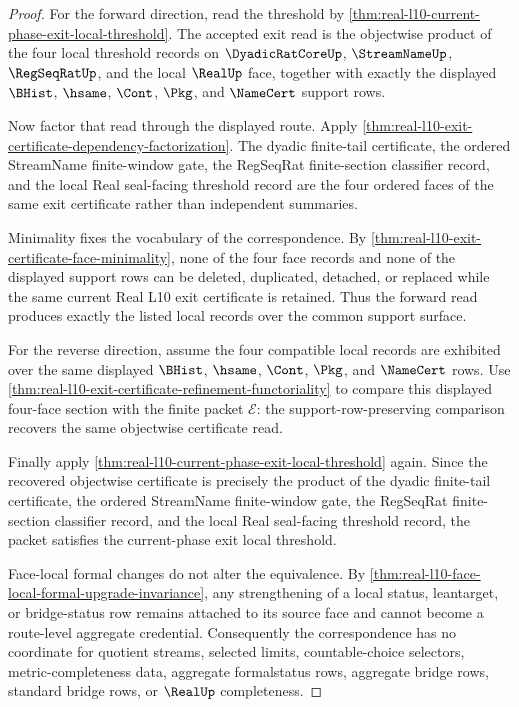 \begin{proof}
For the forward direction, read the threshold by \autoref{thm:real-l10-current-phase-exit-local-threshold}. The accepted exit read is the objectwise product of the four local threshold records on $\DyadicRatCoreUp$, $\StreamNameUp$, $\RegSeqRatUp$, and the local $\RealUp$ face, together with exactly the displayed $\BHist$, $\hsame$, $\Cont$, $\Pkg$, and $\NameCert$ support rows.

Now factor that read through the displayed route. Apply \autoref{thm:real-l10-exit-certificate-dependency-factorization}. The dyadic finite-tail certificate, the ordered StreamName finite-window gate, the RegSeqRat finite-section classifier record, and the local Real seal-facing threshold record are the four ordered faces of the same exit certificate rather than independent summaries.

Minimality fixes the vocabulary of the correspondence. By \autoref{thm:real-l10-exit-certificate-face-minimality}, none of the four face records and none of the displayed support rows can be deleted, duplicated, detached, or replaced while the same current Real L10 exit certificate is retained. Thus the forward read produces exactly the listed local records over the common support surface.

For the reverse direction, assume the four compatible local records are exhibited over the same displayed $\BHist$, $\hsame$, $\Cont$, $\Pkg$, and $\NameCert$ rows. Use \autoref{thm:real-l10-exit-certificate-refinement-functoriality} to compare this displayed four-face section with the finite packet $\mathcal E$: the support-row-preserving comparison recovers the same objectwise certificate read.

Finally apply \autoref{thm:real-l10-current-phase-exit-local-threshold} again. Since the recovered objectwise certificate is precisely the product of the dyadic finite-tail certificate, the ordered StreamName finite-window gate, the RegSeqRat finite-section classifier record, and the local Real seal-facing threshold record, the packet satisfies the current-phase exit local threshold.

Face-local formal changes do not alter the equivalence. By \autoref{thm:real-l10-face-local-formal-upgrade-invariance}, any strengthening of a local status, leantarget, or bridge-status row remains attached to its source face and cannot become a route-level aggregate credential. Consequently the correspondence has no coordinate for quotient streams, selected limits, countable-choice selectors, metric-completeness data, aggregate formalstatus rows, aggregate bridge rows, standard bridge rows, or $\RealUp$ completeness.
\end{proof}

